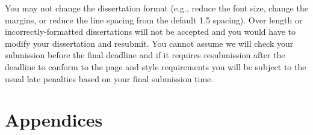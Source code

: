 \documentclass[msc,deptreport]{infthesis} %
\begin{document}
You may not change the dissertation format (e.g., reduce the font
size, change the margins, or reduce the line spacing from the default
1.5 spacing). Over length or incorrectly-formatted dissertations will
not be accepted and you would have to modify your dissertation and
resubmit.  You cannot assume we will check your submission before the
final deadline and if it requires resubmission after the deadline to
conform to the page and style requirements you will be subject to the
usual late penalties based on your final submission time.





\chapter*{Appendices}

% 
% 
% 
\end{document}
